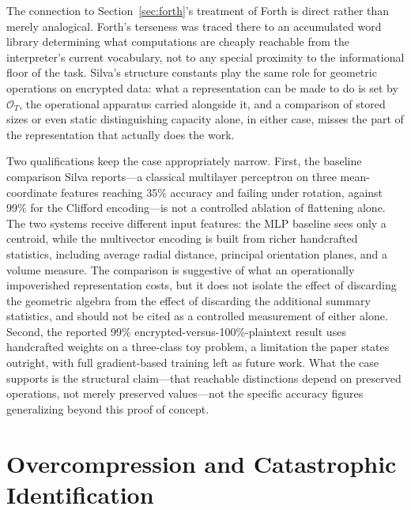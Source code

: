 \documentclass[11pt]{article}
\theoremstyle{plain}
\begin{document}
The connection to Section~\ref{sec:forth}'s treatment of Forth is direct rather than merely analogical. Forth's terseness was traced there to an accumulated word library determining what computations are cheaply reachable from the interpreter's current vocabulary, not to any special proximity to the informational floor of the task. Silva's structure constants play the same role for geometric operations on encrypted data: what a representation can be made to do is set by $\mathcal{O}_T$, the operational apparatus carried alongside it, and a comparison of stored sizes or even static distinguishing capacity alone, in either case, misses the part of the representation that actually does the work.

Two qualifications keep the case appropriately narrow. First, the baseline comparison Silva reports---a classical multilayer perceptron on three mean-coordinate features reaching 35\% accuracy and failing under rotation, against 99\% for the Clifford encoding---is not a controlled ablation of flattening alone. The two systems receive different input features: the MLP baseline sees only a centroid, while the multivector encoding is built from richer handcrafted statistics, including average radial distance, principal orientation planes, and a volume measure. The comparison is suggestive of what an operationally impoverished representation costs, but it does not isolate the effect of discarding the geometric algebra from the effect of discarding the additional summary statistics, and should not be cited as a controlled measurement of either alone. Second, the reported 99\% encrypted-versus-100\%-plaintext result uses handcrafted weights on a three-class toy problem, a limitation the paper states outright, with full gradient-based training left as future work. What the case supports is the structural claim---that reachable distinctions depend on preserved operations, not merely preserved values---not the specific accuracy figures generalizing beyond this proof of concept.

\section{Overcompression and Catastrophic Identification}
\label{sec:overcompression}
\end{document}
